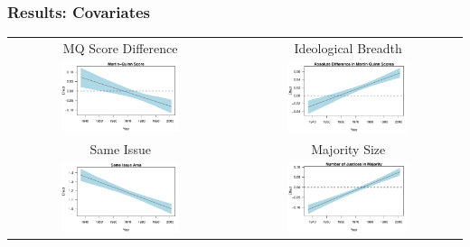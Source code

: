 \documentclass[handout]{beamer}
\newenvironment{changemargin}[2]{%
  \begin{list}{}{%
    \setlength{\topsep}{0pt}%
    \setlength{\leftmargin}{#1}%
    \setlength{\rightmargin}{#2}%
    \setlength{\listparindent}{\parindent}%
    \setlength{\itemindent}{\parindent}%
    \setlength{\parsep}{\parskip}%
  }%
  \item[]}{\end{list}}
\begin{document}
\begin{frame} \frametitle{Results: Covariates}
\begin{changemargin}{-1cm}{-1cm}
\centering

 \begin{tabular}{cc}
  MQ Score Difference & Ideological Breadth \\
\includegraphics[width = 0.55\textwidth, trim= 1cm 1cm 0.5cm .45cm,clip=true]{../../images/mq_coef_trend.pdf} & \includegraphics[width = 0.55\textwidth, trim= 1cm 1cm 0.5cm .45cm,clip=true]{../../images/absdiffmq_coef_trend.pdf} \\
 
   Same Issue &  Majority Size \\
\includegraphics[width = 0.55\textwidth, trim= 1cm 1cm 0.5cm .45cm,clip=true]{../../images/sameissue_coef_trend.pdf} & \includegraphics[width = 0.55\textwidth, trim= 1cm 1cm 0.5cm .45cm,clip=true]{../../images/numberjusticespro_coef_trend.pdf} \\
 
 
\end{tabular}

\end{changemargin}
\end{frame}
\end{document}
